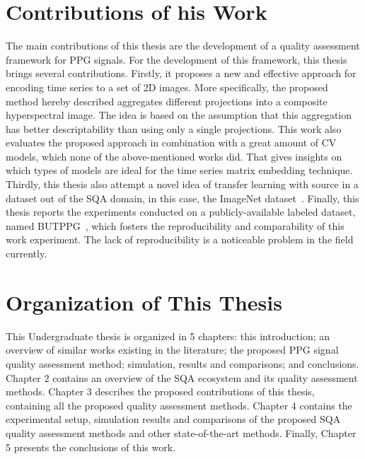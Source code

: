 \section{Contributions of his Work}
\label{sec:my_work}

The main contributions of this thesis are the development of a quality assessment framework for \gls{PPG} signals. For the development of this framework, this thesis brings several contributions. Firstly, it proposes a new and effective approach for encoding time series to a set of 2D images. More specifically, the proposed method hereby described aggregates different projections into a composite hyperspectral image. The idea is based on the assumption that this aggregation has better descriptability than using only a single projections. This work also evaluates the proposed approach in combination with a great amount of \gls{CV} models, which none of the above-mentioned works did. That gives insights on which types of models are ideal for the time series matrix embedding technique. Thirdly, this thesis also attempt a novel idea of transfer learning with source in a dataset out of the \gls{SQA} domain, in this case, the ImageNet dataset~\cite{ImageNet}. Finally, this thesis reports the experiments conducted on a publicly-available labeled dataset, named \gls{BUTPPG}~\cite{butppg}, which fosters the reproducibility and comparability of this work experiment. The lack of reproducibility is a noticeable problem in the field currently.

\section{Organization of This Thesis}
\label{sec:organization}

This Undergraduate thesis is organized in 5 chapters: this introduction; an overview of similar works existing in the literature; the proposed \gls{PPG} signal quality assessment method; simulation, results and comparisons; and conclusions. Chapter 2 contains an overview of the \gls{SQA} ecosystem and its quality assessment methods. Chapter 3 describes the proposed contributions of this thesis, containing all the proposed quality assessment methods. Chapter 4 contains the experimental setup, simulation results and comparisons of the proposed \gls{SQA} quality assessment methods and other state-of-the-art methods. Finally, Chapter 5 presents the conclusions of this work.

